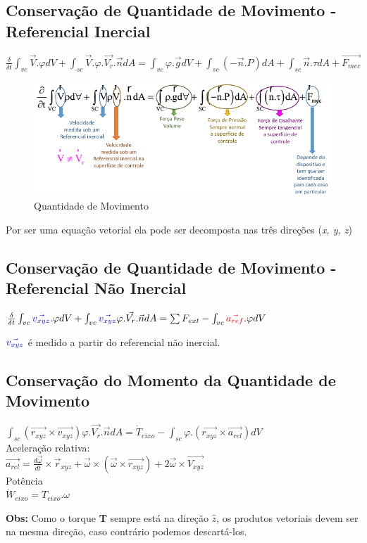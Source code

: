 \documentclass[a4paper, 12pt]{article}
\begin{document}
\subsection{Conservação de Quantidade de Movimento - Referencial Inercial}
	\begin{center}
		\Large
		$
		\frac{\delta}{\delta t}\int_{vc} \vec{V}.\varphi dV + \int_{sc}\vec{V}. \varphi. \vec{V_{r}}.\vec{n}dA = \int_{vc} \varphi.\vec{g}dV + \int_{sc}(-\vec{n}.P)dA+\int_{sc}\vec{n}.\tau dA + \vec{F_{mec}}
		$
	\end{center}
\begin{figure}[h]
	\centering
	\includegraphics[width=0.5\linewidth]{imagens/eq}
	\caption{Quantidade de Movimento}
	\label{fig:eq}
\end{figure}
	Por ser uma equação vetorial ela pode ser decomposta nas três direções (\textit{x, y, z})

\subsection{Conservação de Quantidade de Movimento - Referencial Não Inercial}
	\begin{center}
		\Large
		$
		\frac{\delta}{\delta t}\int_{vc}\textcolor{blue}{\vec{v_{xyz}}}.\varphi dV + \int_{vc}\textcolor{blue}{\vec{v_{xyz}}}\varphi.\vec{V_{r}} .\vec{n}dA = \sum F_{ext} - \int_{vc} \textcolor{red}{\vec{a_{ref}}} .\varphi dV   
		$
	\end{center}
	$\textcolor{blue}{\vec{v_{xyz}}}$ é medido a partir do referencial não inercial.
\subsection{Conservação do Momento da Quantidade de Movimento}
	\begin{center}
		\Large
		$
		\int_{sc}(\vec{r_{xyz}}\times \vec{v_{xyz}})\varphi .\vec{V_{r}}.\vec{n} dA = \dot{T}_{eixo} - \int_{sc} \varphi .(\vec{r_{xyz}}\times \vec{a_{rel}})dV
		$\\
		Aceleração relativa:\\
		$
		\vec{a_{rel}} = \frac{d \vec{\omega}}{dt} \times \vec{r}_{xyz} + \vec{\omega} \times (\vec{\omega} \times \vec{r_{xyz}}) + 2\vec{\omega} \times \vec{V_{xyz}}
		$\\
		Potência\\
		$
		\dot{W}_{eixo} = T_{eixo}. \omega
		$
		
	\end{center}
\textbf{Obs:} Como o torque \textbf{T} sempre está na direção $\hat{z}$, os produtos vetoriais devem ser na mesma direção, caso contrário podemos descartá-los.
\end{document}
